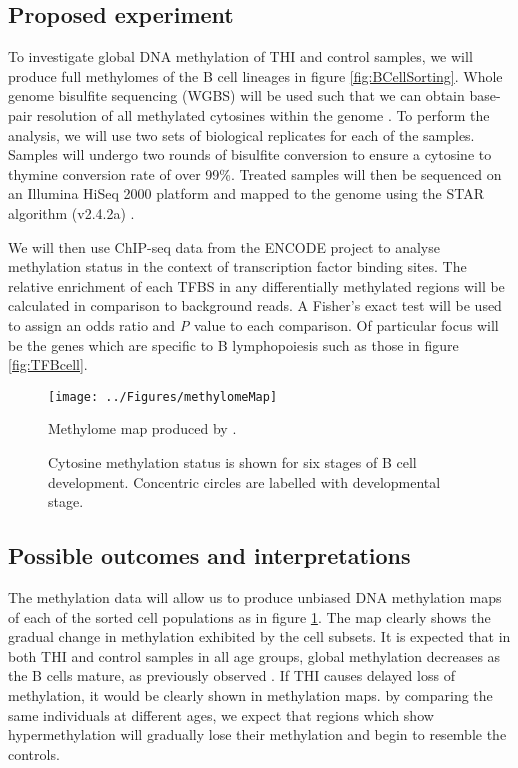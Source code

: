 \documentclass[12pt]{article}
\begin{document}
		\subsection{Proposed experiment}
		
			To investigate global DNA methylation of THI and control samples, we will produce full methylomes of the B cell lineages in figure \ref{fig:BCellSorting}. 
			Whole genome bisulfite sequencing (WGBS) will be used such that we can obtain base-pair resolution of all methylated cytosines within the genome \citep{Kulis15,Oakes16}. 
			To perform the analysis, we will use two sets of biological replicates for each of the samples. 
			Samples will undergo two rounds of bisulfite conversion to ensure a cytosine to thymine conversion rate of over 99\%.
			Treated samples will then be sequenced on an Illumina HiSeq 2000 platform and mapped to the genome using the STAR algorithm (v2.4.2a) \citep{Dobin13}.
			
			We will then use ChIP-seq data from the ENCODE project \citep{ENCODE-Project-Consortium12} to analyse methylation status in the context of transcription factor binding sites.
			The relative enrichment of each TFBS in any differentially methylated regions will be calculated in comparison to background reads. 
			A Fisher's exact test will be used to assign an odds ratio and \textit{P} value to each comparison. 
			Of particular focus will be the genes which are specific to B lymphopoiesis such as those in figure \ref{fig:TFBcell}.

	\begin{figure}[tb]
		\centering
			\texttt{[image: ../Figures/methylomeMap]}
			\caption{Methylome map produced by \citet{Kulis15}. }
			\label{fig:MethMap}

		\caption{Cytosine methylation status is shown for six stages of B cell development. Concentric circles are labelled with developmental stage.}
	\end{figure}
			
		
		\subsection{Possible outcomes and interpretations}

			The methylation data will allow us to produce unbiased DNA methylation maps of each of the sorted cell populations as in figure \ref{fig:MethMap}.
			The map clearly shows the gradual change in methylation exhibited by the cell subsets. 
			It is expected that in both THI and control samples in all age groups, global methylation decreases as the B cells mature, as previously observed \citep{Kulis15,Lai13,Kulis12,Shaknovich11}. 
			If THI causes delayed loss of methylation, it would be clearly shown in methylation maps.
			by comparing the same individuals at different ages, we expect that regions which show hypermethylation will gradually lose their methylation and begin to resemble the controls.
			
\end{document}
